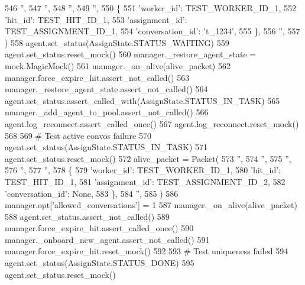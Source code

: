 \begin{DoxyCode}
546             \textcolor{stringliteral}{''},
547             \textcolor{stringliteral}{''},
548             \textcolor{stringliteral}{''},
549             \textcolor{stringliteral}{''},
550             \{
551                 \textcolor{stringliteral}{'worker\_id'}: TEST\_WORKER\_ID\_1,
552                 \textcolor{stringliteral}{'hit\_id'}: TEST\_HIT\_ID\_1,
553                 \textcolor{stringliteral}{'assignment\_id'}: TEST\_ASSIGNMENT\_ID\_1,
554                 \textcolor{stringliteral}{'conversation\_id'}: \textcolor{stringliteral}{'t\_1234'},
555             \},
556             \textcolor{stringliteral}{''},
557         )
558         agent.set\_status(AssignState.STATUS\_WAITING)
559         agent.set\_status.reset\_mock()
560         manager.\_restore\_agent\_state = mock.MagicMock()
561         manager.\_on\_alive(alive\_packet)
562         manager.force\_expire\_hit.assert\_not\_called()
563         manager.\_restore\_agent\_state.assert\_not\_called()
564         agent.set\_status.assert\_called\_with(AssignState.STATUS\_IN\_TASK)
565         manager.\_add\_agent\_to\_pool.assert\_not\_called()
566         agent.log\_reconnect.assert\_called\_once()
567         agent.log\_reconnect.reset\_mock()
568 
569         \textcolor{comment}{# Test active convos failure}
570         agent.set\_status(AssignState.STATUS\_IN\_TASK)
571         agent.set\_status.reset\_mock()
572         alive\_packet = Packet(
573             \textcolor{stringliteral}{''},
574             \textcolor{stringliteral}{''},
575             \textcolor{stringliteral}{''},
576             \textcolor{stringliteral}{''},
577             \textcolor{stringliteral}{''},
578             \{
579                 \textcolor{stringliteral}{'worker\_id'}: TEST\_WORKER\_ID\_1,
580                 \textcolor{stringliteral}{'hit\_id'}: TEST\_HIT\_ID\_1,
581                 \textcolor{stringliteral}{'assignment\_id'}: TEST\_ASSIGNMENT\_ID\_2,
582                 \textcolor{stringliteral}{'conversation\_id'}: \textcolor{keywordtype}{None},
583             \},
584             \textcolor{stringliteral}{''},
585         )
586         manager.opt[\textcolor{stringliteral}{'allowed\_conversations'}] = 1
587         manager.\_on\_alive(alive\_packet)
588         agent.set\_status.assert\_not\_called()
589         manager.force\_expire\_hit.assert\_called\_once()
590         manager.\_onboard\_new\_agent.assert\_not\_called()
591         manager.force\_expire\_hit.reset\_mock()
592 
593         \textcolor{comment}{# Test uniqueness failed}
594         agent.set\_status(AssignState.STATUS\_DONE)
595         agent.set\_status.reset\_mock()

\end{DoxyCode}
